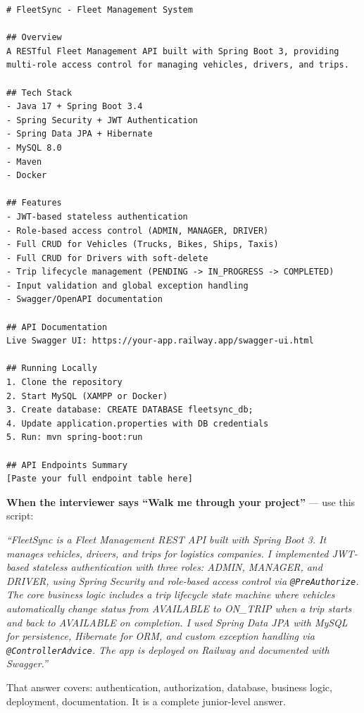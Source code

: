 \documentclass[12pt,a4paper]{report}
\newcommand{\code}[1]{\texttt{\textcolor{keywordblue}{#1}}}
\begin{document}
\begin{lstlisting}[style=bashstyle,caption=README.md Structure]
# FleetSync - Fleet Management System

## Overview
A RESTful Fleet Management API built with Spring Boot 3, providing
multi-role access control for managing vehicles, drivers, and trips.

## Tech Stack
- Java 17 + Spring Boot 3.4
- Spring Security + JWT Authentication
- Spring Data JPA + Hibernate
- MySQL 8.0
- Maven
- Docker

## Features
- JWT-based stateless authentication
- Role-based access control (ADMIN, MANAGER, DRIVER)
- Full CRUD for Vehicles (Trucks, Bikes, Ships, Taxis)
- Full CRUD for Drivers with soft-delete
- Trip lifecycle management (PENDING -> IN_PROGRESS -> COMPLETED)
- Input validation and global exception handling
- Swagger/OpenAPI documentation

## API Documentation
Live Swagger UI: https://your-app.railway.app/swagger-ui.html

## Running Locally
1. Clone the repository
2. Start MySQL (XAMPP or Docker)
3. Create database: CREATE DATABASE fleetsync_db;
4. Update application.properties with DB credentials
5. Run: mvn spring-boot:run

## API Endpoints Summary
[Paste your full endpoint table here]
\end{lstlisting}

\begin{tcolorbox}[interviewbox]
\textbf{When the interviewer says ``Walk me through your project''} --- use this script:

\textit{``FleetSync is a Fleet Management REST API built with Spring Boot 3. It manages vehicles, drivers, and trips for logistics companies. I implemented JWT-based stateless authentication with three roles: ADMIN, MANAGER, and DRIVER, using Spring Security and role-based access control via \code{@PreAuthorize}. The core business logic includes a trip lifecycle state machine where vehicles automatically change status from AVAILABLE to ON\_TRIP when a trip starts and back to AVAILABLE on completion. I used Spring Data JPA with MySQL for persistence, Hibernate for ORM, and custom exception handling via \code{@ControllerAdvice}. The app is deployed on Railway and documented with Swagger.''}

That answer covers: authentication, authorization, database, business logic, deployment, documentation. It is a complete junior-level answer.
\end{tcolorbox}
\end{document}
